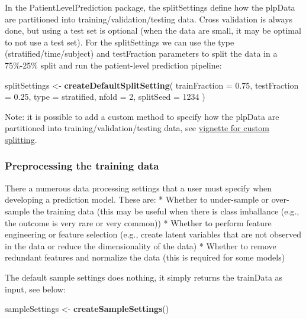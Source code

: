 \documentclass[
]{article}
\newenvironment{Shaded}{\begin{snugshade}}{\end{snugshade}}
\newcommand{\AttributeTok}[1]{\textcolor[rgb]{0.13,0.29,0.53}{#1}}
\newcommand{\DecValTok}[1]{\textcolor[rgb]{0.00,0.00,0.81}{#1}}
\newcommand{\FloatTok}[1]{\textcolor[rgb]{0.00,0.00,0.81}{#1}}
\newcommand{\FunctionTok}[1]{\textcolor[rgb]{0.13,0.29,0.53}{\textbf{#1}}}
\newcommand{\NormalTok}[1]{#1}
\newcommand{\OtherTok}[1]{\textcolor[rgb]{0.56,0.35,0.01}{#1}}
\newcommand{\StringTok}[1]{\textcolor[rgb]{0.31,0.60,0.02}{#1}}
\begin{document}
In the PatientLevelPrediction package, the splitSettings define how the
plpData are partitioned into training/validation/testing data. Cross
validation is always done, but using a test set is optional (when the
data are small, it may be optimal to not use a test set). For the
splitSettings we can use the type (stratified/time/subject) and
testFraction parameters to split the data in a 75\%-25\% split and run
the patient-level prediction pipeline:

\begin{Shaded}
\begin{Highlighting}[]
\NormalTok{  splitSettings }\OtherTok{\textless{}{-}} \FunctionTok{createDefaultSplitSetting}\NormalTok{(}
    \AttributeTok{trainFraction =} \FloatTok{0.75}\NormalTok{,}
    \AttributeTok{testFraction =} \FloatTok{0.25}\NormalTok{,}
    \AttributeTok{type =} \StringTok{\textquotesingle{}stratified\textquotesingle{}}\NormalTok{,}
    \AttributeTok{nfold =} \DecValTok{2}\NormalTok{, }
    \AttributeTok{splitSeed =} \DecValTok{1234}
\NormalTok{    )}
\end{Highlighting}
\end{Shaded}

Note: it is possible to add a custom method to specify how the plpData
are partitioned into training/validation/testing data, see
\href{https://github.com/OHDSI/PatientLevelPrediction/blob/master/inst/doc/AddingCustomSplitting.pdf}{vignette
for custom splitting}.

\hypertarget{preprocessing-the-training-data}{%
\subsubsection{Preprocessing the training
data}\label{preprocessing-the-training-data}}

There a numerous data processing settings that a user must specify when
developing a prediction model. These are: * Whether to under-sample or
over-sample the training data (this may be useful when there is class
imballance (e.g., the outcome is very rare or very common)) * Whether to
perform feature engineering or feature selection (e.g., create latent
variables that are not observed in the data or reduce the dimensionality
of the data) * Whether to remove redundant features and normalize the
data (this is required for some models)

The default sample settings does nothing, it simply returns the
trainData as input, see below:

\begin{Shaded}
\begin{Highlighting}[]
\NormalTok{  sampleSettings }\OtherTok{\textless{}{-}} \FunctionTok{createSampleSettings}\NormalTok{()}
\end{Highlighting}
\end{Shaded}
\end{document}
